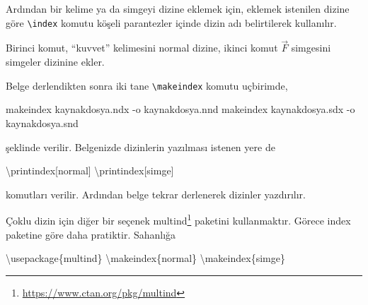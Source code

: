 \documentclass[
  10pt,
]{scrbook}
\newenvironment{Shaded}{\begin{snugshade}}{\end{snugshade}}
\newcommand{\BuiltInTok}[1]{#1}
\newcommand{\ExtensionTok}[1]{#1}
\newcommand{\FunctionTok}[1]{\textcolor[rgb]{0.00,0.00,0.00}{#1}}
\newcommand{\NormalTok}[1]{#1}
\newcommand{\SpecialCharTok}[1]{\textcolor[rgb]{0.00,0.00,0.00}{#1}}
\newcommand{\SpecialStringTok}[1]{\textcolor[rgb]{0.31,0.60,0.02}{#1}}
\renewcommand{\href}[2]{#2\footnote{\url{#1}}}
\theoremstyle{definition}
\theoremstyle{definition}
\theoremstyle{definition}
\theoremstyle{definition}
\theoremstyle{remark}
\begin{document}
Ardından bir kelime ya da simgeyi dizine eklemek için, eklemek istenilen
dizine göre \texttt{\textbackslash{}index} komutu köşeli parantezler içinde dizin adı
belirtilerek kullanılır.

\begin{Shaded}
\end{Shaded}

Birinci komut, ``kuvvet'' kelimesini normal dizine, ikinci komut \(\vec{F}\) simgesini simgeler dizinine ekler.

Belge derlendikten sonra iki tane \texttt{\textbackslash{}makeindex} komutu uçbirimde,

\begin{Shaded}
\begin{Highlighting}[]
\NormalTok{makeindex kaynakdosya.ndx {-}o kaynakdosya.nnd }
\NormalTok{makeindex kaynakdosya.sdx {-}o kaynakdosya.snd }
\end{Highlighting}
\end{Shaded}

şeklinde verilir. Belgenizde dizinlerin yazılması istenen yere de

\begin{Shaded}
\begin{Highlighting}[]
\FunctionTok{\textbackslash{}printindex}\NormalTok{[normal]}
\FunctionTok{\textbackslash{}printindex}\NormalTok{[simge]}
\end{Highlighting}
\end{Shaded}

komutları verilir. Ardından belge tekrar derlenerek dizinler yazdırılır.

Çoklu dizin için diğer bir seçenek
\href{https://www.ctan.org/pkg/multind}{multind} paketini kullanmaktır. Görece
index paketine göre daha pratiktir. Sahanlığa

\begin{Shaded}
\begin{Highlighting}[]
\BuiltInTok{\textbackslash{}usepackage}\NormalTok{\{}\ExtensionTok{multind}\NormalTok{\}}
\FunctionTok{\textbackslash{}makeindex}\NormalTok{\{normal\}}
\FunctionTok{\textbackslash{}makeindex}\NormalTok{\{simge\}}
\end{Highlighting}
\end{Shaded}
\end{document}
